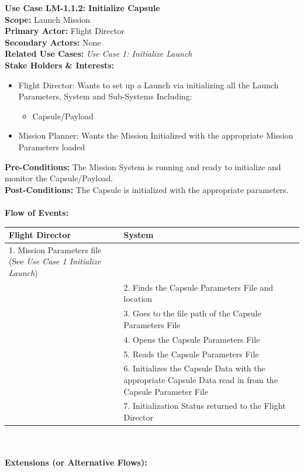 \documentclass[letterpaper]{article}
\begin{document}
\noindent
\textbf{Use Case LM-1.1.2:  Initialize Capsule}\\
\textbf{Scope:  }Launch Mission\\
\textbf{Primary Actor: }Flight Director\\
\textbf{Secondary Actors: }None\\
\textbf{Related Use Cases:  }\textit{Use Case 1:  Initialize Launch}\\
\textbf{Stake Holders \& Interests:}
\begin{itemize}
   \item Flight Director:  Wants to set up a Launch via initializing
      all the Launch Parameters, System and Sub-Systems Including:
      \begin{itemize}
         \item Capsule/Payload
      \end{itemize}
   \item Mission Planner:  Wants the Mission Initialized with the 
      appropriate Mission Parameters loaded
\end{itemize}
\textbf{Pre-Conditions:  }The Mission System is running and ready to
initialize and monitor the Capsule/Payload.\\
\textbf{Post-Conditions: }The Capsule is initialized with the 
appropriate parameters.\\\\
\textbf{Flow of Events:}\\
\begin{tabular}{|p{5.75cm}|p{5.75cm}|}\hline
   \textbf{Flight Director}&\textbf{System}\\\hline
 1. Mission Parameters file (See 
    \textit{Use Case 1 Initialize Launch})&\\\hline
&2. Finds the Capsule Parameters File and location\\\hline
&3. Goes to the file path of the Capsule Parameters File\\\hline
&4. Opens the Capsule Parameters File\\\hline
&5. Reads the Capsule Parameters File\\\hline
&6. Initializes the Capsule Data with the appropriate Capsule Data
    read in from the Capsule Parameter File\\\hline
&7. Initialization Status returned to the Flight Director\\\hline
\end{tabular}\\\\
\textbf{Extensions (or Alternative Flows):}
\end{document}
